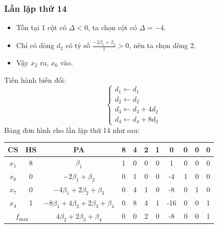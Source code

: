 \documentclass[12pt]{article}
\begin{document}
\subsubsection{Lần lặp thứ 14}
\begin{itemize}
\item Tồn tại 1 cột có $\Delta < 0$, ta chọn cột có $\Delta = -4$.
\item Chỉ có dòng $d_2$ có tỷ số $\displaystyle \frac{-2\beta_1 + \beta_2}{1} > 0$, nên ta chọn dòng 2.
\item Vậy $x_2$ ra, $x_6$ vào.
\end{itemize}
Tiến hành biến đổi:
$$
\left\{
\begin{array}{lll}
d_1 \leftarrow d_1 \\
d_2 \leftarrow d_2\\
d_3 \leftarrow d_3 + 4d_2\\
d_4 \leftarrow d_4 + 8d_2
\end{array}
\right.
$$
Bảng đơn hình cho lần lặp thứ 14 như sau:
\begin{table}[H]
\centering
\begin{tabular}{|c|c|c|c|c|c|c|c|c|c|c|}
\hline
CS & HS & PA & 8 & 4 & 2 & 1 & 0 & 0 & 0 & 0 \\
\hline
$x_1$ & 8 & $\beta_1$ & 1 & 0 & 0 & 0 & 1 & 0 & 0 & 0 \\
$x_6$ & 0 & $-2\beta_1 + \beta_2$ & 0 & 1 & 0 & 0 & -4 & 1 & 0 & 0 \\
$x_7$ & 0 & $-4\beta_1 + 2\beta_2 + \beta_3$ & 0 & 4 & 1 & 0 & -8 & 0 & 1 & 0 \\
$x_4$ & 1 & $-8\beta_1 + 4\beta_2 + 2\beta_3 + \beta_4$ & 0 & 8 & 4 & 1 & -16 & 0 & 0 & 1 \\
\hline
\multicolumn{2}{|c|}{$f_{\max}$}
& $4\beta_2 + 2\beta_3 + \beta_4$ & 0 & 0 & 2 & 0 & -8 & 0 & 0 & 1 \\
\hline
\end{tabular}
\end{table}
\end{document}
